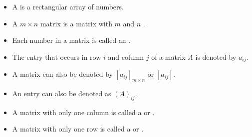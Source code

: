       \begin{itemize}
        \item A  is a rectangular array of numbers.
        \item A $m \times n$ matrix is a matrix with $m$ 
          and $n$ .
        \item Each number in a matrix is called an .
        \item The entry that occurs in row $i$ and column $j$ of a matrix $A$
          is denoted by $a_{ij}$.
        \item A matrix can also be denoted by $[a_{ij}]_{m \times n}$ or
          $[a_{ij}]$.
        \item An entry can also be denoted as $(A)_{ij}$.
      \end{itemize}
      \begin{itemize}
        \item A matrix with only one column is called a  or
          .
        \item A matrix with only one row is called a  or
          .
      \end{itemize}
      \par 
  \hiiEND

